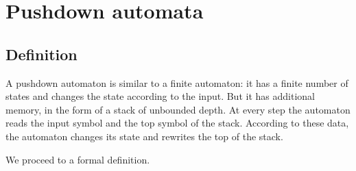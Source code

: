\section{Pushdown automata}
\subsection{Definition}
A pushdown automaton is similar to a finite automaton:
it has a finite number of states and changes the state according to the input.
But it has additional memory, in the form of a stack of unbounded depth.
At every step the automaton reads the input symbol and the top symbol of the stack.
According to these data, the automaton changes its state and rewrites the top of the stack.

We proceed to a formal definition.
